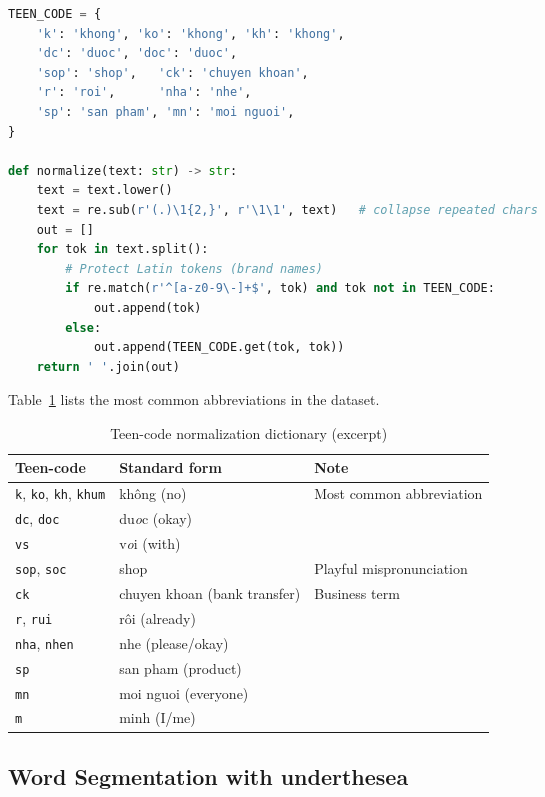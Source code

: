 \documentclass[12pt, a4paper]{report}
\begin{document}
\begin{lstlisting}[language=Python, caption={Text normalization function}]
TEEN_CODE = {
    'k': 'khong', 'ko': 'khong', 'kh': 'khong',
    'dc': 'duoc', 'doc': 'duoc',
    'sop': 'shop',   'ck': 'chuyen khoan',
    'r': 'roi',      'nha': 'nhe',
    'sp': 'san pham', 'mn': 'moi nguoi',
}

def normalize(text: str) -> str:
    text = text.lower()
    text = re.sub(r'(.)\1{2,}', r'\1\1', text)   # collapse repeated chars
    out = []
    for tok in text.split():
        # Protect Latin tokens (brand names)
        if re.match(r'^[a-z0-9\-]+$', tok) and tok not in TEEN_CODE:
            out.append(tok)
        else:
            out.append(TEEN_CODE.get(tok, tok))
    return ' '.join(out)
\end{lstlisting}

Table~\ref{tab:teencode} lists the most common abbreviations in the dataset.

\begin{table}[H]
\centering
\caption{Teen-code normalization dictionary (excerpt)}
\label{tab:teencode}
\begin{tabular}{lll}
\toprule
\textbf{Teen-code} & \textbf{Standard form} & \textbf{Note} \\
\midrule
\texttt{k}, \texttt{ko}, \texttt{kh}, \texttt{khum} & kh\^ong (no) & Most common abbreviation \\
\texttt{dc}, \texttt{doc}  & du\textit{o}c (okay)   & \\
\texttt{vs}                & v\textit{o}i (with)    & \\
\texttt{sop}, \texttt{soc} & shop                   & Playful mispronunciation \\
\texttt{ck}                & chuyen khoan (bank transfer) & Business term \\
\texttt{r}, \texttt{rui}   & r\^oi (already)        & \\
\texttt{nha}, \texttt{nhen}& nhe (please/okay)      & \\
\texttt{sp}                & san pham (product)     & \\
\texttt{mn}                & moi nguoi (everyone)   & \\
\texttt{m}                 & minh (I/me)            & \\
\bottomrule
\end{tabular}
\end{table}

\subsection{Word Segmentation with underthesea}
\end{document}
